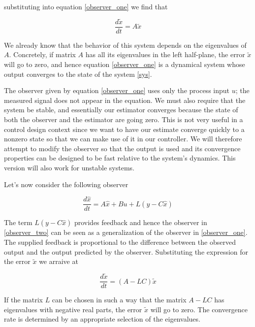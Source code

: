 substituting into equation \ref{observer_one} we find that


\begin{equation}
\frac{d\tilde{x}}{dt} = A\tilde{x}  
\end{equation}  

We already know that the behavior of this system depends on the eigenvalues of $A$. Concretely, if matrix $A$ has all its eigenvalues in the left half-plane, the error $\tilde{x}$ will go to zero,
and hence equation \ref{observer_one} is a dynamical system whose output converges to the state
of the system \ref{sys}.


The observer given by equation \ref{observer_one} uses only the process input $u$; the measured
signal does not appear in the equation. We must also require that the system be stable,
and essentially our estimator converges because the state of both the observer and
the estimator are going zero. This is not very useful in a control design context since
we want to have our estimate converge quickly to a nonzero state so that we can
make use of it in our controller. We will therefore attempt to modify the observer
so that the output is used and its convergence properties can be designed to be fast
relative to the system’s dynamics. This version will also work for unstable systems.

Let's now consider the following observer

\begin{equation}
\frac{d \hat{x}}{dt} = A\hat{x} + Bu + L(y- C \hat{x})
\label{observer_two}   
\end{equation}

The term $L(y- C \hat{x})$ provides feedback and hence the observer in \ref{observer_two} can be seen as a generalization of the observer in \ref{observer_one}. The supplied feedback is proportional to the difference between the observed output and the output predicted by the observer. Substituting the expression for the error $\tilde{x}$ we arraive at

 \begin{equation}
\frac{d\tilde{x}}{dt} = (A-LC)\tilde{x} 
\label{observer_two}   
\end{equation} 

If the matrix $L$ can be chosen in such a way that the matrix $A-LC$ has eigenvalues with negative real parts, the error $\tilde{x}$ will go to zero. The convergence rate is determined by an appropriate selection of the eigenvalues.
 

